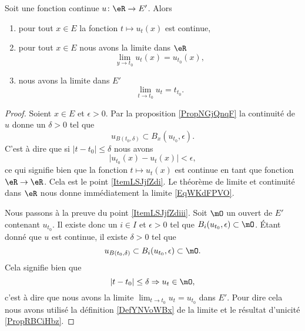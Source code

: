 \begin{proposition} \label{PropVKSNflB}
    Soit une fonction continue \( u\colon \eR\to E'\). Alors
    \begin{enumerate}
        \item   \label{ItemLSJjfZdi}
            pour tout \( x\in E\) la fonction \( t\mapsto u_t(x)\) est continue,
        \item\label{ItemLSJjfZdii}
            pour tout \( x\in E\) nous avons la limite dans \( \eR\)
            \begin{equation}    \label{EqWKdFPVO}
                \lim_{y\to t_0} u_t(x)=u_{t_0}(x),
            \end{equation}
        \item\label{ItemLSJjfZdiii}
            nous avons la limite dans \( E'\) 
            \begin{equation}
                \lim_{t\to t_0} u_t=t_{t_0}.
            \end{equation}
    \end{enumerate}
\end{proposition}

\begin{proof}
    Soient \( x\in E\) et \( \epsilon> 0\). Par la proposition \ref{PropNGjQnqF} la continuité de \( u\) donne un \( \delta>0\) tel que
    \begin{equation}
        u_{B(t_0,\delta)}\subset B_x(u_{t_0},\epsilon).
    \end{equation}
    C'est à dire que si \( | t-t_0 |\leq \delta\) nous avons
    \begin{equation}
        \big| u_{t_0}(x)-u_t(x) \big|<\epsilon,
    \end{equation}
    ce qui signifie bien que la fonction \( t\mapsto u_t(x)\) est continue en tant que fonction \( \eR\to \eR\). Cela est le point \ref{ItemLSJjfZdi}. Le théorème de limite et continuité dans \( \eR\) nous donne immédiatement la limite \eqref{EqWKdFPVO}.

    Nous passons à la preuve du point \ref{ItemLSJjfZdiii}. Soit \( \mO\) un ouvert de \( E'\) contenant \( u_{t_0}\). Il existe donc un \( i\in I\) et \( \epsilon>0\) tel que \( B_i(u_{t_0},\epsilon)\subset \mO\). Étant donné que \( u\) est continue, il existe \( \delta>0\) tel que
    \begin{equation}
        u_{B(t_0,\delta)}\subset B_i(u_{t_0},\epsilon)\subset \mO.
    \end{equation}
    Cela signifie bien que 
    \begin{equation}
        | t-t_0 |\leq \delta\Rightarrow u_t\in\mO,
    \end{equation}
    c'est à dire que nous avons la limite \( \lim_{t\to t_0} u_t=u_{t_0}\) dans \( E'\). Pour dire cela nous avons utilisé la définition \ref{DefYNVoWBx} de la limite et le résultat d'unicité \ref{PropRBCiHbz}.
\end{proof}

